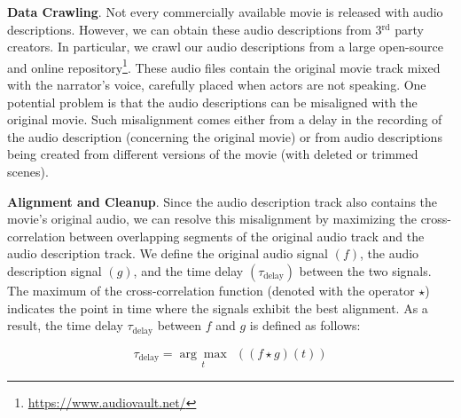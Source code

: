 \documentclass[10pt,twocolumn,letterpaper]{article}
\renewcommand{\paragraph}[1]{\vspace{1mm}\noindent\textbf{#1}.}
\begin{document}
\paragraph{Data Crawling} Not every commercially available movie is released with audio descriptions. However, we can obtain these audio descriptions from 3$^{\text{rd}}$ party creators. In particular, we crawl our audio descriptions from a large open-source and online repository\footnote{\url{https://www.audiovault.net/}}. 
These audio files contain the original movie track mixed with the narrator's voice, carefully placed when actors are not speaking.
One potential problem is that the audio descriptions can be misaligned with the original movie. Such misalignment comes either from a delay in the recording of the audio description (concerning the original movie) or from audio descriptions being created from different versions of the movie (with deleted or trimmed scenes). 

\paragraph{Alignment and Cleanup} Since the audio description track also contains the movie's original audio, we can resolve this misalignment by maximizing the cross-correlation between overlapping segments of the original audio track and the audio description track. We define the original audio signal $(f)$, the audio description signal $(g)$, and the time delay $(\tau_{\mathrm{delay}})$ between the two signals. The maximum of the cross-correlation function (denoted with the operator $\star$) indicates the point in time where the signals exhibit the best alignment. As a result, the time delay $\tau_{\mathrm{delay}}$ between $f$ and $g$ is defined as follows: 

\vspace{-0.2cm}
\begin{equation}
    \tau _{\mathrm {delay} }={\underset {t}{\arg\max}~~((f \star g)(t))}    \label{eq:Xcorr}
\end{equation}
\end{document}
